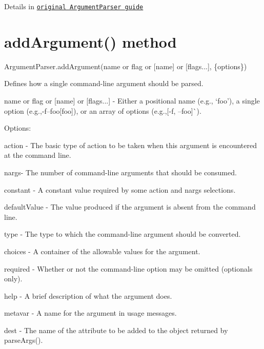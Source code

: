 Details in \href{http://docs.python.org/dev/library/argparse.html#argumentparser-objects}{\tt original Argument\+Parser guide}

\section*{add\+Argument() method }


\begin{DoxyCode}
ArgumentParser.addArgument(name or flag or [name] or [flags...], \{options\})
\end{DoxyCode}


Defines how a single command-\/line argument should be parsed.


\begin{DoxyItemize}
\item {\ttfamily name or flag or \mbox{[}name\mbox{]} or \mbox{[}flags...\mbox{]}} -\/ Either a positional name (e.\+g., `\textquotesingle{}foo'{\ttfamily ), a single option (e.\+g.,}\textquotesingle{}-\/f\textquotesingle{}--foo\mbox{[}\textquotesingle{}foo\textquotesingle{}\mbox{]}{\ttfamily ), or an array of options (e.\+g.,}\mbox{[}\textquotesingle{}-\/f\textquotesingle{}, \textquotesingle{}--foo\textquotesingle{}\mbox{]}\`{}).
\end{DoxyItemize}

Options\+:


\begin{DoxyItemize}
\item {\ttfamily action} -\/ The basic type of action to be taken when this argument is encountered at the command line.
\item {\ttfamily nargs}-\/ The number of command-\/line arguments that should be consumed.
\item {\ttfamily constant} -\/ A constant value required by some action and nargs selections.
\item {\ttfamily default\+Value} -\/ The value produced if the argument is absent from the command line.
\item {\ttfamily type} -\/ The type to which the command-\/line argument should be converted.
\item {\ttfamily choices} -\/ A container of the allowable values for the argument.
\item {\ttfamily required} -\/ Whether or not the command-\/line option may be omitted (optionals only).
\item {\ttfamily help} -\/ A brief description of what the argument does.
\item {\ttfamily metavar} -\/ A name for the argument in usage messages.
\item {\ttfamily dest} -\/ The name of the attribute to be added to the object returned by parse\+Args().
\end{DoxyItemize}

